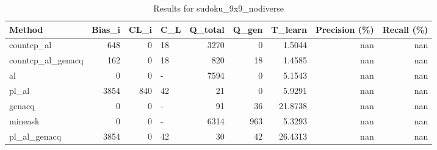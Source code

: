 \begin{table}[ht]
\caption{Results for sudoku_9x9_nodiverse}
\begin{tabular}{lrrlrrrrr}
\hline
 Method            &   Bias\_i &   CL\_i & C\_L   &   Q\_total &   Q\_gen &   T\_learn &   Precision (\%) &   Recall (\%) \\
\hline
 countcp\_al        &      648 &      0 & 18    &      3270 &       0 &    1.5044 &             nan &          nan \\
 countcp\_al\_genacq &      162 &      0 & 18    &       820 &      18 &    1.4585 &             nan &          nan \\
 al                &        0 &      0 & -     &      7594 &       0 &    5.1543 &             nan &          nan \\
 pl\_al             &     3854 &    840 & 42    &        21 &       0 &    5.9291 &             nan &          nan \\
 genacq            &        0 &      0 & -     &        91 &      36 &   21.8738 &             nan &          nan \\
 mineask           &        0 &      0 & -     &      6314 &     963 &    5.3293 &             nan &          nan \\
 pl\_al\_genacq      &     3854 &      0 & 42    &        30 &      42 &   26.4313 &             nan &          nan \\
\hline
\end{tabular}
\end{table}